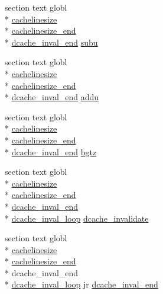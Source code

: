\begin{DoxyCompactItemize}
\item 
section text globl \\*
\hyperlink{libc_8h_a7737fc4bdea8d6ab04f67ef74c3f1b9d}{cachelinesize} \\*
\hyperlink{mips_2cache_8S_af5c24722116775c4c23de29430fa84bb}{cachelinesize\-\_\-end} \\*
\hyperlink{mips_2cache_8S_af97c183dce4888af33c2cb9b767bf0f5}{dcache\-\_\-inval\-\_\-end} \hyperlink{mips_2cache_8S_a557a95c2e71cd7fd74aa19f5e26f685b}{subu}
\item 
section text globl \\*
\hyperlink{libc_8h_a7737fc4bdea8d6ab04f67ef74c3f1b9d}{cachelinesize} \\*
\hyperlink{mips_2cache_8S_af5c24722116775c4c23de29430fa84bb}{cachelinesize\-\_\-end} \\*
\hyperlink{mips_2cache_8S_af97c183dce4888af33c2cb9b767bf0f5}{dcache\-\_\-inval\-\_\-end} \hyperlink{mips_2cache_8S_a37f1f1c43bf5f6e25669e6ed01da3ceb}{addu}
\item 
section text globl \\*
\hyperlink{libc_8h_a7737fc4bdea8d6ab04f67ef74c3f1b9d}{cachelinesize} \\*
\hyperlink{mips_2cache_8S_af5c24722116775c4c23de29430fa84bb}{cachelinesize\-\_\-end} \\*
\hyperlink{mips_2cache_8S_af97c183dce4888af33c2cb9b767bf0f5}{dcache\-\_\-inval\-\_\-end} \hyperlink{mips_2cache_8S_a4b7de3228ae32f752501ac65564d183a}{bgtz}
\item 
section text globl \\*
\hyperlink{libc_8h_a7737fc4bdea8d6ab04f67ef74c3f1b9d}{cachelinesize} \\*
\hyperlink{mips_2cache_8S_af5c24722116775c4c23de29430fa84bb}{cachelinesize\-\_\-end} \\*
\hyperlink{mips_2cache_8S_af97c183dce4888af33c2cb9b767bf0f5}{dcache\-\_\-inval\-\_\-end} \\*
\hyperlink{mips_2cache_8S_a459bb079d7d84a2808893e96da86d2df}{dcache\-\_\-inval\-\_\-loop} \hyperlink{mips_2cache_8S_a6b1cee7dfcedefdfff3639527ddaca97}{dcache\-\_\-invalidate}
\item 
section text globl \\*
\hyperlink{libc_8h_a7737fc4bdea8d6ab04f67ef74c3f1b9d}{cachelinesize} \\*
\hyperlink{mips_2cache_8S_af5c24722116775c4c23de29430fa84bb}{cachelinesize\-\_\-end} \\*
dcache\-\_\-inval\-\_\-end \\*
\hyperlink{mips_2cache_8S_a459bb079d7d84a2808893e96da86d2df}{dcache\-\_\-inval\-\_\-loop} jr \hyperlink{mips_2cache_8S_af97c183dce4888af33c2cb9b767bf0f5}{dcache\-\_\-inval\-\_\-end}
\end{DoxyCompactItemize}



